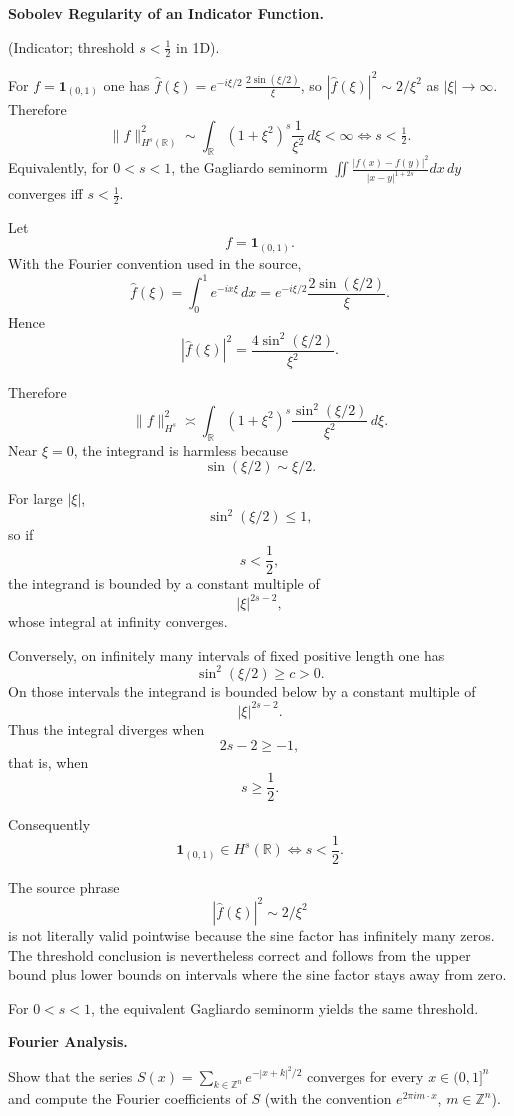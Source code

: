 \begin{problem}[CP-II-0158]
\label{prob:cp-ii-0158}
\textbf{Sobolev Regularity of an Indicator Function.}

\hspace*{1.5em}(Indicator; threshold $s<\tfrac12$ in 1D).

For $f=\mathbf 1_{(0,1)}$ one has
\(
\widehat f(\xi)=e^{-i\xi/2}\,\frac{2\sin(\xi/2)}{\xi}
\),
so $|\widehat f(\xi)|^2\sim 2/\xi^2$ as $|\xi|\to\infty$. Therefore
\[
\|f\|_{H^s(\mathbb R)}^2 \sim \int_{\mathbb R} (1+\xi^2)^s \frac{1}{\xi^2}\,d\xi<\infty
\iff s<\tfrac12.
\]
Equivalently, for $0<s<1$, the Gagliardo seminorm
$\iint \frac{|f(x)-f(y)|^2}{|x-y|^{1+2s}}dx\,dy$
converges iff $s<\tfrac12$.
\end{problem}

\begin{solution}
Let
\[
f=\mathbf1_{(0,1)}.
\]
With the Fourier convention used in the source,
\[
\widehat f(\xi)
=
\int_0^1e^{-ix\xi}\,dx
=
e^{-i\xi/2}\frac{2\sin(\xi/2)}{\xi}.
\]
Hence
\[
|\widehat f(\xi)|^2
=
\frac{4\sin^2(\xi/2)}{\xi^2}.
\]

Therefore
\[
\|f\|_{H^s}^2
\asymp
\int_{\mathbb R}
(1+\xi^2)^s
\frac{\sin^2(\xi/2)}{\xi^2}\,d\xi.
\]
Near \(\xi=0\), the integrand is harmless because
\[
\sin(\xi/2)\sim\xi/2.
\]

For large \(|\xi|\),
\[
\sin^2(\xi/2)\le1,
\]
so if
\[
s<\frac12,
\]
the integrand is bounded by a constant multiple of
\[
|\xi|^{2s-2},
\]
whose integral at infinity converges.

Conversely, on infinitely many intervals of fixed positive length one has
\[
\sin^2(\xi/2)\ge c>0.
\]
On those intervals the integrand is bounded below by a constant multiple of
\[
|\xi|^{2s-2}.
\]
Thus the integral diverges when
\[
2s-2\ge-1,
\]
that is, when
\[
s\ge\frac12.
\]

Consequently
\[
\boxed{
\mathbf1_{(0,1)}\in H^s(\mathbb R)
\iff
s<\frac12.
}
\]

The source phrase
\[
|\widehat f(\xi)|^2\sim2/\xi^2
\]
is not literally valid pointwise because the sine factor has infinitely many zeros. The
threshold conclusion is nevertheless correct and follows from the upper bound plus lower
bounds on intervals where the sine factor stays away from zero.

For \(0<s<1\), the equivalent Gagliardo seminorm yields the same threshold.
\end{solution}


\begin{problem}[CP-II-0160]
\label{prob:cp-ii-0160}
\textbf{Fourier Analysis.}

\hspace*{1.5em}Show that the series $S(x)=\sum_{k\in\mathbb Z^n} e^{-|x+k|^2/2}$ converges for every $x\in(0,1]^n$ and compute
the Fourier coefficients of $S$ (with the convention $e^{2\pi i m\cdot x}$, $m\in\mathbb Z^n$).
\end{problem}

